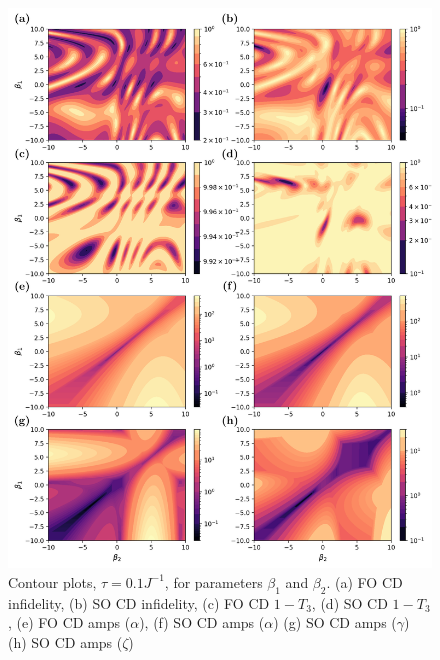 \begin{figure}[t]
    \centering
    \includegraphics[width=\linewidth]{images/ghz_contour_plots.png} \caption[Contour plots of cost function landscapes for GHZ state preparation in frustrated spin systems.]{Contour plots, $\tau = 0.1 J^{-1}$,  for parameters $\beta_1$ and $\beta_2$. (a) FO CD infidelity, (b) SO CD infidelity, (c) FO CD $1 - T_3$, (d) SO CD $1 - T_3$, (e) FO CD amps ($\alpha$), (f) SO CD amps ($\alpha$) (g) SO CD amps ($\gamma$) (h) SO CD amps ($\zeta$)}\label{fig:two_spin_higher_order}
\end{figure}